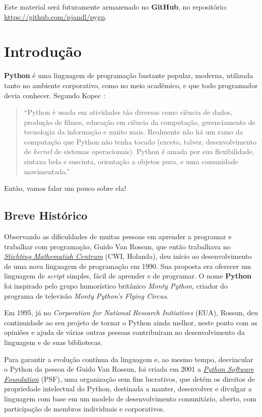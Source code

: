 \documentclass[
]{book}
\begin{document}
Este material será futuramente armazenado no \textbf{GitHub}, no repositório: \url{https://github.com/pjandl/pygp}.

\hypertarget{intro}{%
\chapter{Introdução}\label{intro}}

\textbf{Python} é uma linguagem de programação bastante popular, moderna, utilizada tanto no ambiente corporativo, como no meio acadêmico, e que todo programador devia conhecer. Segundo Kopec \citep[pág.1]{kop2019}:

\begin{quote}
``Python é usada em atividades tão diversas como ciência de dados, produção de filmes, educação em ciência da computação, gerenciamento de tecnologia da informação e muito mais. Realmente não há um ramo da computação que Python não tenha tocado (exceto, talvez, desenvolvimento de \emph{kernel} de sistemas operacionais). Python é amada por sua flexibilidade, sintaxa bela e suscinta, orientação a objetos pura, e uma comunidade movimentada.''
\end{quote}

Então, vamos falar um pouco sobre ela!

\hypertarget{introd-histo}{%
\section{Breve Histórico}\label{introd-histo}}

Observando as dificuldades de muitas pessoas em aprender a programar e trabalhar com programação, Guido Van Rossun, que então trabalhava no \href{http://www.cwi.nl/}{\emph{Stichting Mathematish Centrum}} (CWI, Holanda), deu início ao desenvolvimento de uma nova linguagem de programação em 1990. Sua proposta era oferecer um linguagem de \emph{script} simples, fácil de aprender e de programar. O nome \textbf{Python} foi inspirado pelo grupo humorístico britânico \emph{Monty Python}, criador do programa de televisão \emph{Monty Python's Flying Circus}.

Em 1995, já no \emph{Corporation for National Research Initiatives} (EUA), Rossun, deu continuidade ao seu projeto de tornar o Python ainda melhor, neste ponto com as opiniões e ajuda de várias outras pessoas contribuíram no desenvolvimento da linguagem e de suas bibliotecas.

Para garantir a evolução contínua da linguagem e, ao mesmo tempo, desvincular o Python da pessoa de Guido Van Rossun, foi criada em 2001 a \href{https://www.python.org/psf/}{\emph{Python Software Foundation}} (PSF), uma organização sem fins lucrativos, que detém os direitos de propriedade intelectual do Python, destinada a manter, desenvolver e divulgar a linguagem com base em um modelo de desenvolvimento comunitário, aberto, com participação de membros individuais e corporativos.
\end{document}

